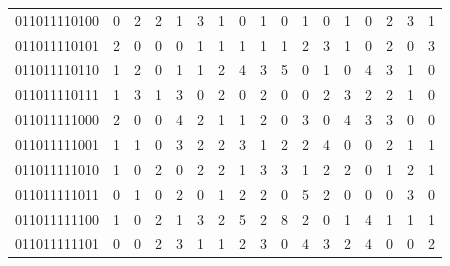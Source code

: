 \documentclass[10pt,a4paper]{article}
\begin{document}
\begin{longtable}{ |c|c|c|c|c|c|c|c|c|c|c|c|c|c|c|c|c| }
    011011110100              & 0                            & 2                                & 2                            & 1                              & 3   & 1   & 0   & 1   & 0   & 1   & 0   & 1   & 0   & 2   & 3   & 1   \\
    011011110101              & 2                            & 0                                & 0                            & 0                              & 1   & 1   & 1   & 1   & 1   & 2   & 3   & 1   & 0   & 2   & 0   & 3   \\
    011011110110              & 1                            & 2                                & 0                            & 1                              & 1   & 2   & 4   & 3   & 5   & 0   & 1   & 0   & 4   & 3   & 1   & 0   \\
    011011110111              & 1                            & 3                                & 1                            & 3                              & 0   & 2   & 0   & 2   & 0   & 0   & 2   & 3   & 2   & 2   & 1   & 0   \\
    011011111000              & 2                            & 0                                & 0                            & 4                              & 2   & 1   & 1   & 2   & 0   & 3   & 0   & 4   & 3   & 3   & 0   & 0   \\
    011011111001              & 1                            & 1                                & 0                            & 3                              & 2   & 2   & 3   & 1   & 2   & 2   & 4   & 0   & 0   & 2   & 1   & 1   \\
    011011111010              & 1                            & 0                                & 2                            & 0                              & 2   & 2   & 1   & 3   & 3   & 1   & 2   & 2   & 0   & 1   & 2   & 1   \\
    011011111011              & 0                            & 1                                & 0                            & 2                              & 0   & 1   & 2   & 2   & 0   & 5   & 2   & 0   & 0   & 0   & 3   & 0   \\
    011011111100              & 1                            & 0                                & 2                            & 1                              & 3   & 2   & 5   & 2   & 8   & 2   & 0   & 1   & 4   & 1   & 1   & 1   \\
    011011111101              & 0                            & 0                                & 2                            & 3                              & 1   & 1   & 2   & 3   & 0   & 4   & 3   & 2   & 4   & 0   & 0   & 2   \\

\end{longtable}
\end{document}
